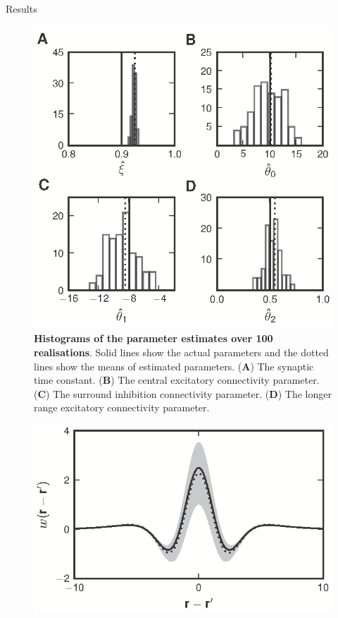 \documentclass[final]{beamer}
\newlength{\onecolwid}
\begin{document}
\begin{frame}[t]
\begin{columns}[t]
\begin{column}{\onecolwid}
      			  
      \begin{block}{Results}
		\begin{figure}	
		\begin{center}
		  \includegraphics[width=9in, scale = 10]{Figure7.eps}
		\end{center}
		\caption{{\bf Histograms of the parameter estimates over 100
		realisations}. Solid lines show the actual parameters and the dotted lines show the means of estimated parameters. (\textbf{A}) The synaptic time constant. (\textbf{B}) The central excitatory connectivity parameter. (\textbf{C}) The surround inhibition connectivity parameter. (\textbf{D}) The longer range excitatory connectivity parameter.} 
		\label{fig:Figure7}	
		\end{figure}
		\begin{figure}
		\begin{center}
		\includegraphics[width=9in, scale = 10]{Figure8.eps}

\end{center}
\end{figure}
\end{block}
\end{column}
\end{columns}
\end{frame}
\end{document}

